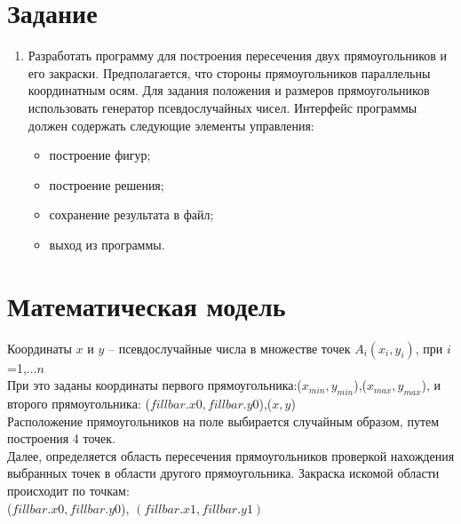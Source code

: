 \documentclass[14pt, a4paper]{extreport}
\begin{document}
\author{Гаврилова~А.Ю.}
\maketitle

\chapter{Задание}

\begin{enumerate}

	\item
	Разработать программу для построения пересечения двух прямоугольников и его закраски. Предполагается, что стороны прямоугольников параллельны координатным осям. Для задания положения и размеров прямоугольников использовать генератор псевдослучайных чисел. Интерфейс программы должен содержать следующие элементы управления:
	\begin{itemize}
		\item построение фигур;
		\item построение решения;
		\item сохранение результата в файл;
		\item выход из программы.
	\end{itemize}

\end{enumerate}


\chapter{Математическая модель}
Координаты $x$ и $y$ -- псевдослучайные числа в множестве точек $A_i(x_i,y_i)$, при $i$=1,...$n$\\
При это заданы координаты первого прямоугольника:($x_{min},y_{min} $),($x_{max},y_{max} $), и второго прямоугольника: ($fillbar.x0, fillbar.y0$),($x,y$)\\
Расположение прямоугольников на поле выбирается случайным образом, путем построения 4 точек.\\
Далее, определяется область пересечения прямоугольников проверкой нахождения выбранных точек в области другого прямоугольника. Закраска искомой области происходит по точкам:\\($fillbar.x0, fillbar.y0$), $(fillbar.x1, fillbar.y1)$
\end{document}
